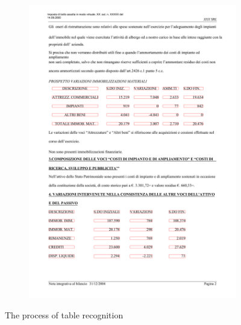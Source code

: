 \begin{figure}[p]
\begin{subfigure}{0.45\textwidth}
\includegraphics[width=\linewidth]{img/implementation/implem4.png}
\caption{}
\label{fig:implem4}
\end{subfigure}
\caption{The process of table recognition}
\label{fig:implemTableRecogniton}
\end{figure}
